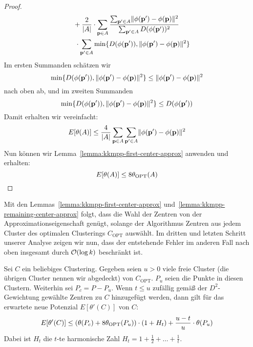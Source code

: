 \begin{proof}
\begin{align*}
						& \; \; \; \; \; + \frac{2}{\left|A\right|} \cdot
							\sum_{\mathbf{p} \in A} \frac{\sum_{\mathbf{p}' \in A} \lVert {\phi(\ensuremath{\mathbf{p}}')} - {\phi(\mathbf{p})} \rVert^2}{\sum_{\mathbf{p}' \in A} D(\phi(\mathbf{p}'))^2} \\
						& \; \; \; \; \; \; \cdot \sum_{\mathbf{p}' \in A} \min \{ D(\phi(\mathbf{p}')), \lVert {\phi(\ensuremath{\mathbf{p}}')} - {\phi(\mathbf{p})} \rVert^2 \}
	\end{align*}
	Im ersten Summanden schätzen wir
	\[ \min \{ D(\phi(\mathbf{p}')), \lVert {\phi(\ensuremath{\mathbf{p}}')} - {\phi(\mathbf{p})} \rVert^2 \} \leq \lVert {\phi(\ensuremath{\mathbf{p}}')} - {\phi(\mathbf{p})} \rVert^2 \]
	nach oben ab, und im zweiten Summanden
	\[ \min \{ D(\phi(\mathbf{p}')), \lVert {\phi(\ensuremath{\mathbf{p}}')} - {\phi(\mathbf{p})} \rVert^2 \} \leq D(\phi(\mathbf{p}')) \]
	Damit erhalten wir vereinfacht:
	\[ E[\theta(A)] \leq \frac{4}{\left|A\right|} \sum_{\mathbf{p} \in A} \sum_{\mathbf{p}' \in A} \lVert {\phi(\ensuremath{\mathbf{p}}')} - {\phi(\mathbf{p})} \rVert^2 \]
	Nun können wir Lemma~\ref{lemma:kkmpp-first-center-approx} anwenden und erhalten:
	\[ E[\theta(A)] \leq 8 \theta_{\textrm{OPT}}(A) \]
\end{proof}
Mit den Lemmas~\ref{lemma:kkmpp-first-center-approx} und~\ref{lemma:kkmpp-remaining-center-approx} folgt, dass
die Wahl der Zentren von \kkmpp{} der Approximationseigenschaft genügt, solange der Algorithmus Zentren aus jedem Cluster
des optimalen Clusterings $C_\textrm{OPT}$ auswählt. Im dritten und letzten Schritt unserer Analyse zeigen wir nun,
dass der entstehende Fehler im anderen Fall nach oben insgesamt durch $\mathcal{O}(\log k)$ beschränkt ist.

\begin{lemma}
\label{lemma:kkmpp-error}
	Sei $C$ ein beliebiges Clustering. Gegeben seien $u > 0$ viele freie Cluster (die übrigen Cluster nennen wir abgedeckt)
	von $C_\textrm{OPT}$. $P_u$ seien die Punkte in
	diesen Clustern. Weiterhin sei $P_c = P - P_u$. Wenn $t \leq u$ zufällig gemäß der $D^2$-Gewichtung gewählte Zentren zu
	$C$ hinzugefügt werden, dann gilt für das erwartete neue Potenzial $E[\theta'(C)]$ von $C$:
	\[ E[\theta'(C)] \leq \left( \theta(P_c) + 8 \theta_{\textrm{OPT}}(P_u) \right) \cdot (1 + H_t) + \frac{u-t}{u} \cdot \theta(P_u) \]
	Dabei ist $H_t$ die $t$-te harmonische Zahl $H_t = 1 + \frac{1}{2} + \dots + \frac{1}{t}$.
\end{lemma}

